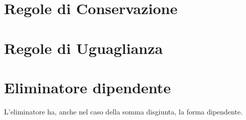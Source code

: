 \section{Regole di Conservazione}
\label{subsec: conservazione-disjointsum}
\small
\begin{adjustwidth}{-5em}{}
\begin{prooftree}
\end{prooftree}
\end{adjustwidth}
\small
\begin{adjustwidth}{-5em}{}
\begin{prooftree}
\end{prooftree}
\end{adjustwidth}


\section{Regole di Uguaglianza}
\label{subsec: uguaglianza-disjointsum}
\normalsize
\begin{prooftree}
\end{prooftree}

\section{Eliminatore dipendente}
\label{subsec:eliminatore dipendente-disjointsum}
L'eliminatore ha, anche nel caso della somma disgiunta, la forma dipendente.
\small
\begin{adjustwidth}{-5em}{}
\begin{prooftree}
\end{prooftree}
\end{adjustwidth}

